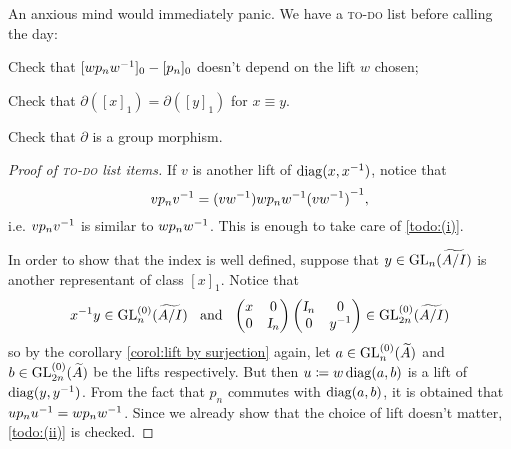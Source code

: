 An anxious mind would immediately panic. We have a \textsc{to-do} list before calling the day:
\begin{itroman}
    \item\label{todo:(i)} Check that $[wp_n {w}^{-1}]_0 - [p_n]_0$ doesn't depend on the lift $w$ chosen;
    \item\label{todo:(ii)} Check that $\partial([x]_1) = \partial([y]_1)$ for $x \equiv y$.
    \item\label{todo:(iii)} Check that $\partial$ is a group morphism.   
\end{itroman}
\begin{proof}[Proof of \textsc{to-do} list items]
    If $v$ is another lift of $\operatorname{diag}(x, {x}^{-1})$, notice that 
    $$
    vp_n {v}^{-1} = (v{w}^{-1})wp_n{w}^{-1}{(v{w}^{-1})}^{-1},
    $$
    i.e. $vp_n {v}^{-1}$ is similar to $wp_n {w}^{-1}$. This is enough to take care of \ref{todo:(i)}.

    In order to show that the index is well defined, suppose that $y \in \operatorname{GL}_n(\widetilde{A/I})$ is another representant of class $[x]_1$. Notice that 
    $$
    {x}^{-1}y \in \operatorname{GL}_n^{(0)}(\widetilde{A/I}) \hspace{0.25cm}\operatorname{and}\hspace{0.25cm} \begin{pmatrix} x & 0 \\ 0 & \textsl{I}_n\end{pmatrix}\begin{pmatrix} \textsl{I}_n & 0 \\ 0 & {y}^{-1}\end{pmatrix} \in \operatorname{GL}_{2n}^{(0)}(\widetilde{A/I})
    $$
    so by the corollary \ref{corol:lift by surjection} again, let $a \in \operatorname{GL}_n^{(0)}(\widetilde{A})$ and $b\in \operatorname{GL}_{2n}^{(0)}(\widetilde{A})$ be the lifts respectively. But then $u \coloneqq w \operatorname{diag}(a,b)$ is a lift of $\operatorname{diag}(y, {y}^{-1})$. From the fact that $p_n$ commutes with $\operatorname{diag}(a,b)$, it is obtained that $up_n {u}^{-1} = wp_n {w}^{-1}$. Since we already show that the choice of lift doesn't matter, \ref{todo:(ii)} is checked.
    

\end{proof}
